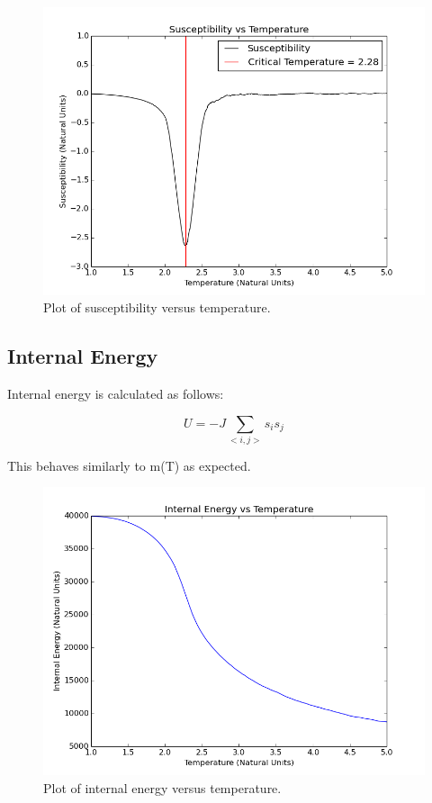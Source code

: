 \documentclass[10pt]{article}
\newcommand{\beq}{\begin{equation}}
\newcommand{\eeq}{\end{equation}}
\newcommand{\n}{\noindent}
\begin{document}
\begin{figure}[H]
\centering
\begin{minipage}{.75\textwidth}
\centering
\includegraphics[width= \linewidth]{Sus_v_Temp.png}
\end{minipage}\hfill
\caption{Plot of susceptibility versus temperature.}
\label{fig:figure2}
\end{figure}
\n
\subsection{Internal Energy}
Internal energy is calculated as follows:

\beq
\label{eqn:equation5}
U=-J\sum\limits_{<i,j>} s_is_j
\eeq

This behaves similarly to m(T) as expected.

\begin{figure}[H]
\centering
\begin{minipage}{.75\textwidth}
\centering
\includegraphics[width= \linewidth]{Internal_Energy_v_Temp.png}
\end{minipage}\hfill
\caption{Plot of internal energy versus temperature.}
\label{fig:figure3}
\end{figure}
\n
\end{document}
